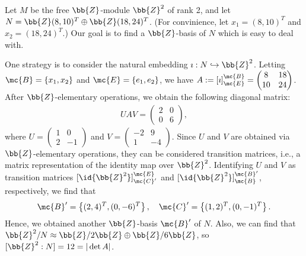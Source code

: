\begin{exmp}
    Let $M$ be the free $\bb{Z}$-module $\bb{Z}^2$ of rank 2, and let $N=\bb{Z}(8, 10)^T\oplus\bb{Z}(18, 24)^T$.
    (For convinience, let $x_1=(8, 10)^T$ and $x_2=(18, 24)^T$.)
    Our goal is to find a $\bb{Z}$-basis of $N$ which is easy to deal with.

    One strategy is to consider the natural embedding $\imath: N\hookrightarrow\bb{Z}^2$.
    Letting $\mc{B}=\{x_1, x_2\}$ and $\mc{E}=\{e_1, e_2\}$, we have
    $A:=[\imath]^\mc{B}_\mc{E}=\begin{pmatrix}
        8   &   18  \\
        10  &   24  
    \end{pmatrix}$.
    After $\bb{Z}$-elementary operations, we obtain the following diagonal matrix:
    \begin{align*}
        UAV=\begin{pmatrix}
            2&0\\0&6
        \end{pmatrix},
    \end{align*}
    where $U=\begin{pmatrix}
        1&0\\2&-1
    \end{pmatrix}$ and $V=\begin{pmatrix}
        -2&9\\1&-4
    \end{pmatrix}$.
    \color{teal}Since $U$ and $V$ are obtained via $\bb{Z}$-elementary operations, they can be considered transition matrices, i.e., a matrix representation of the identity map over $\bb{Z}^2$. \color{black}
    Identifying $U$ and $V$ as transition matrices $[\id{\bb{Z}^2}]^{\mc{E}}_{\mc{C}'}$ and $[\id{\bb{Z}^2}]^{\mc{B}'}_{\mc{B}}$, respectively, we find that
    \begin{align*}
        \mc{B}'=\left\{(2, 4)^T, (0, -6)^T\right\},\quad\mc{C}'=\left\{(1, 2)^T, (0, -1)^T\right\}.
    \end{align*}
    Hence, we obtained another $\bb{Z}$-basis $\mc{B}'$ of $N$.
    Also, we can find that $\bb{Z}^2/N\approx\bb{Z}/2\bb{Z}\oplus\bb{Z}/6\bb{Z}$, so $[\bb{Z}^2: N]=12=|\det A|$.
\end{exmp}

